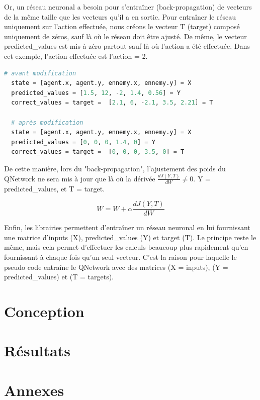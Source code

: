\documentclass[11pt,a4paper]{report}
\begin{document}
  \par Or, un réseau neuronal a besoin pour s’entraîner (back-propagation) de vecteurs de la même taille que les vecteurs qu'il a en sortie. Pour entraîner le réseau uniquement sur l'action effectuée, nous créons le vecteur T (target) composé uniquement de zéros, sauf là où le réseau doit être ajusté. De même, le vecteur predicted\_values est mis à zéro partout sauf là où l'action a été effectuée. Dans cet exemple, l'action effectuée est l'action = 2. 
  
  \begin{lstlisting}[language=python]
  # avant modification
  state = [agent.x, agent.y, ennemy.x, ennemy.y] = X
  predicted_values = [1.5, 12, -2, 1.4, 0.56] = Y
  correct_values = target =  [2.1, 6, -2.1, 3.5, 2.21] = T
  
  # après modification
  state = [agent.x, agent.y, ennemy.x, ennemy.y] = X
  predicted_values = [0, 0, 0, 1.4, 0] = Y
  correct_values = target =  [0, 0, 0, 3.5, 0] = T
  \end{lstlisting} 
  
  \par De cette manière, lors du "back-propagation", l'ajustement des poids du QNetwork ne sera mis à jour que là où la dérivée $\frac{dJ(Y,T)}{dW} \neq 0$. Y = predicted\_values, et T = target.
  
  $$W = W + \alpha \frac{dJ(Y,T)}{dW}$$
  
  \par Enfin, les librairies permettent d’entraîner un réseau neuronal en lui fournissant une matrice d'inputs (X), predicted\_values (Y) et target (T). Le principe reste le même, mais cela permet d'effectuer les calculs beaucoup plus rapidement qu'en fournissant à chaque fois qu'un seul vecteur. C'est la raison pour laquelle le pseudo code entraîne le QNetwork avec des matrices (X = inputs), (Y = predicted\_values) et (T = targets). 
  
  
  \chapter{Conception}
  
  \chapter{Résultats}
  
  \chapter{Annexes}
       
\end{document}
